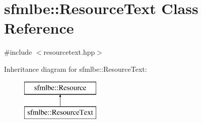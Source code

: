 \hypertarget{classsfmlbe_1_1_resource_text}{}\section{sfmlbe\+:\+:Resource\+Text Class Reference}
\label{classsfmlbe_1_1_resource_text}


{\ttfamily \#include $<$resourcetext.\+hpp$>$}

Inheritance diagram for sfmlbe\+:\+:Resource\+Text\+:\begin{figure}[H]
\begin{center}
\leavevmode
\includegraphics[height=2.000000cm]{classsfmlbe_1_1_resource_text}
\end{center}
\end{figure}
